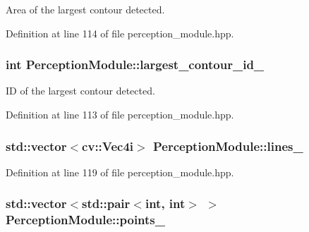Area of the largest contour detected. 



Definition at line 114 of file perception\+\_\+module.\+hpp.

\subsubsection[{\texorpdfstring{largest\+\_\+contour\+\_\+id\+\_\+}{largest_contour_id_}}]{\setlength{\rightskip}{0pt plus 5cm}int Perception\+Module\+::largest\+\_\+contour\+\_\+id\+\_\+\hspace{0.3cm}{\ttfamily [private]}}\hypertarget{class_perception_module_a7936595913566cc046bcecfe3e9803d9}{}\label{class_perception_module_a7936595913566cc046bcecfe3e9803d9}


ID of the largest contour detected. 



Definition at line 113 of file perception\+\_\+module.\+hpp.

\subsubsection[{\texorpdfstring{lines\+\_\+}{lines_}}]{\setlength{\rightskip}{0pt plus 5cm}std\+::vector$<$cv\+::\+Vec4i$>$ Perception\+Module\+::lines\+\_\+\hspace{0.3cm}{\ttfamily [private]}}\hypertarget{class_perception_module_af7aab087aaf76ccf57ef68a8001dc530}{}\label{class_perception_module_af7aab087aaf76ccf57ef68a8001dc530}


Definition at line 119 of file perception\+\_\+module.\+hpp.

\subsubsection[{\texorpdfstring{points\+\_\+}{points_}}]{\setlength{\rightskip}{0pt plus 5cm}std\+::vector$<$std\+::pair$<$int, int$>$ $>$ Perception\+Module\+::points\+\_\+\hspace{0.3cm}{\ttfamily [private]}}\hypertarget{class_perception_module_a9cfd32e708d852e96b117e44643bbfad}{}\label{class_perception_module_a9cfd32e708d852e96b117e44643bbfad}


